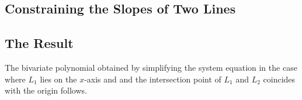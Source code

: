 \subsection{Constraining the Slopes of Two Lines}
\label{ssec:derivation-constraining-slopes}

\subsection{The Result}
\label{ssec:derivation-p2}
The bivariate polynomial obtained by simplifying the system equation in the case where $L_1$ lies on the $x$-axis and and the intersection point of $L_1$ and $L_2$ coincides with the origin follows.

